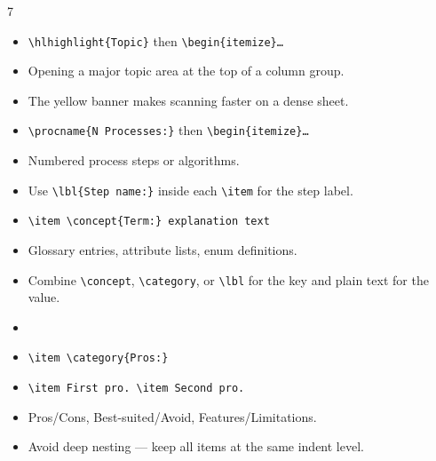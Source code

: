 \documentclass[a4paper,landscape]{article}
\begin{document}
\begin{multicols}{7}
\begin{itemize}
\item {} \texttt{\textbackslash hlhighlight\{Topic\}} then \texttt{\textbackslash begin\{itemize\}…}
\item {} Opening a major topic area at the top of a column group.
\item The yellow banner makes scanning faster on a dense sheet.
\end{itemize}

\begin{itemize}
\item {} \texttt{\textbackslash procname\{N Processes:\}} then \texttt{\textbackslash begin\{itemize\}…}
\item {} Numbered process steps or algorithms.
\item Use \texttt{\textbackslash lbl\{Step name:\}} inside each \texttt{\textbackslash item} for the step label.
\end{itemize}

\begin{itemize}
\item {} \texttt{\textbackslash item \textbackslash concept\{Term:\} explanation text}
\item {} Glossary entries, attribute lists, enum definitions.
\item Combine \texttt{\textbackslash concept}, \texttt{\textbackslash category}, or \texttt{\textbackslash lbl} for the key and plain text for the value.
\end{itemize}

\begin{itemize}
\item {}
\item \texttt{\textbackslash item \textbackslash category\{Pros:\}}
\item \texttt{\textbackslash item First pro. \textbackslash item Second pro.}
\item {} Pros/Cons, Best-suited/Avoid, Features/Limitations.
\item Avoid deep nesting — keep all items at the same indent level.
\end{itemize}



\end{multicols}
\end{document}
